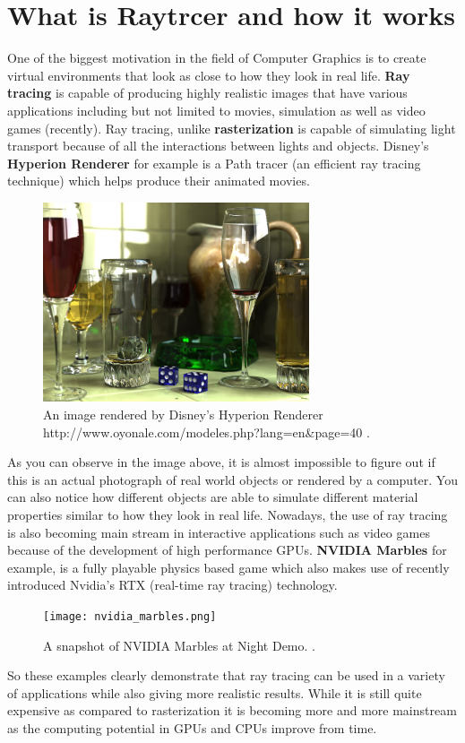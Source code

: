 \documentclass[11pt,a4paper]{article}
\begin{document}
	\section{What is Raytrcer and how it works}
	One of the biggest motivation in the field of Computer Graphics is to create virtual environments that look as close to how they look in real life. \textbf{Ray tracing} is capable of producing highly realistic images that have various applications including but not limited to movies, simulation as well as video games (recently). Ray tracing, unlike \textbf{rasterization} is capable of simulating light transport because of all the interactions between lights and objects. Disney's \textbf{Hyperion Renderer} for example is a Path tracer (an efficient ray tracing technique) which helps produce their animated movies.
	\begin{figure}[H]
		\centering
		\includegraphics[width=0.7\textwidth]{1.jpg}
		\caption{\centering An image rendered by Disney's Hyperion Renderer http://www.oyonale.com/modeles.php?lang=en&page=40 \protect\cite{burley2018design}.}
	\end{figure}
	\noindent
	As you can observe in the image above, it is almost impossible to figure out if this is an actual photograph of real world objects or rendered by a computer. You can also notice how different objects are able to simulate different material properties similar to how they look in real life. Nowadays, the use of ray tracing is also becoming main stream in interactive applications such as video games because of the development of high performance GPUs. \textbf{NVIDIA Marbles} for example, is a fully playable physics based game which also makes use of recently introduced Nvidia's RTX (real-time ray tracing) technology. 
	\begin{figure}[H]
		\centering
		\texttt{[image: nvidia\_marbles.png]}
		\caption{\centering A snapshot of NVIDIA Marbles at Night Demo. \protect\cite{nvidiamarbles}.}
	\end{figure}
	\noindent
	So these examples clearly demonstrate that ray tracing can be used in a variety of applications while also giving more realistic results. While it is still quite expensive as compared to rasterization it is becoming more and more mainstream as the computing potential in GPUs and CPUs improve from time.
	
\end{document}
